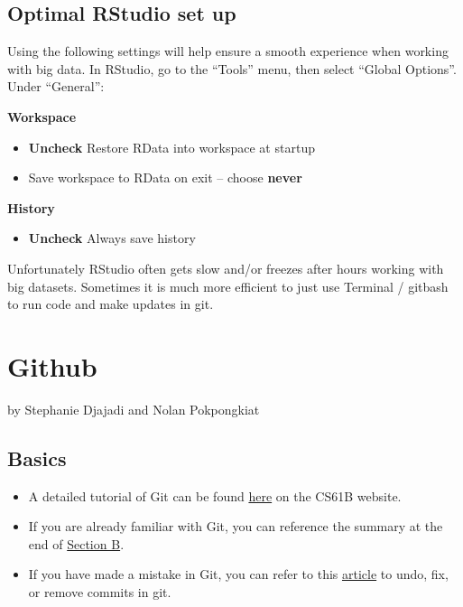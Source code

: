 \documentclass[]{book}
\providecommand{\tightlist}{%
  \setlength{\itemsep}{0pt}\setlength{\parskip}{0pt}}
\begin{document}
\hypertarget{optimal-rstudio-set-up}{%
\section{Optimal RStudio set up}\label{optimal-rstudio-set-up}}

Using the following settings will help ensure a smooth experience when working with big data. In RStudio, go to the ``Tools'' menu, then select ``Global Options''. Under ``General'':

\textbf{Workspace}

\begin{itemize}
\tightlist
\item
  \textbf{Uncheck} Restore RData into workspace at startup
\item
  Save workspace to RData on exit -- choose \textbf{never}
\end{itemize}

\textbf{History}

\begin{itemize}
\tightlist
\item
  \textbf{Uncheck} Always save history
\end{itemize}

Unfortunately RStudio often gets slow and/or freezes after hours working with big datasets. Sometimes it is much more efficient to just use Terminal / gitbash to run code and make updates in git.

\hypertarget{github}{%
\chapter{Github}\label{github}}

by Stephanie Djajadi and Nolan Pokpongkiat

\hypertarget{basics}{%
\section{Basics}\label{basics}}

\begin{itemize}
\tightlist
\item
  A detailed tutorial of Git can be found \href{https://sp19.datastructur.es/materials/guides/using-git\#b-local-repositories-narrative-introduction}{here} on the CS61B website.
\item
  If you are already familiar with Git, you can reference the summary at the end of \href{https://sp19.datastructur.es/materials/guides/using-git\#b-local-repositories-narrative-introduction}{Section B}.
\item
  If you have made a mistake in Git, you can refer to this \href{https://sethrobertson.github.io/GitFixUm/fixup.html}{article} to undo, fix, or remove commits in git.
\end{itemize}
\end{document}
